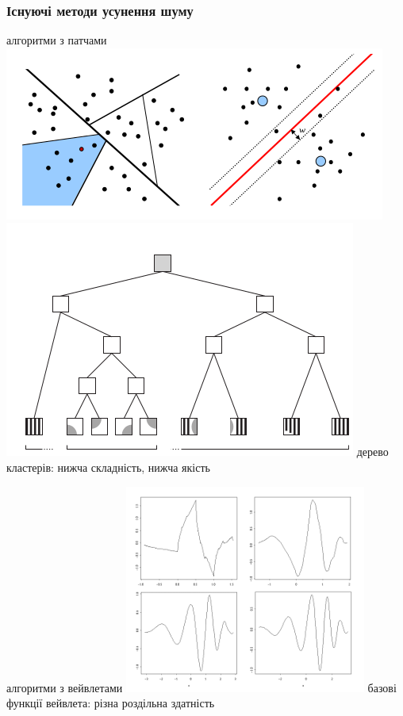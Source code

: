 \documentclass[12pt]{beamer}
\begin{document}
\begin{frame}\frametitle{Існуючі методи усунення шуму}	
	\begin{multicols}{2}
		алгоритми з патчами 
		\includegraphics[scale=0.25]{images/cluster} \linebreak
		\includegraphics[scale=0.2]{images/patch2} \linebreak
		дерево кластерів: нижча складність, нижча якість
		\columnbreak
		
		алгоритми з вейвлетами
		\includegraphics[scale=0.4]{images/waves} \linebreak
		базові функції вейвлета: різна роздільна здатність
	\end{multicols}
\end{frame}
\end{document}
